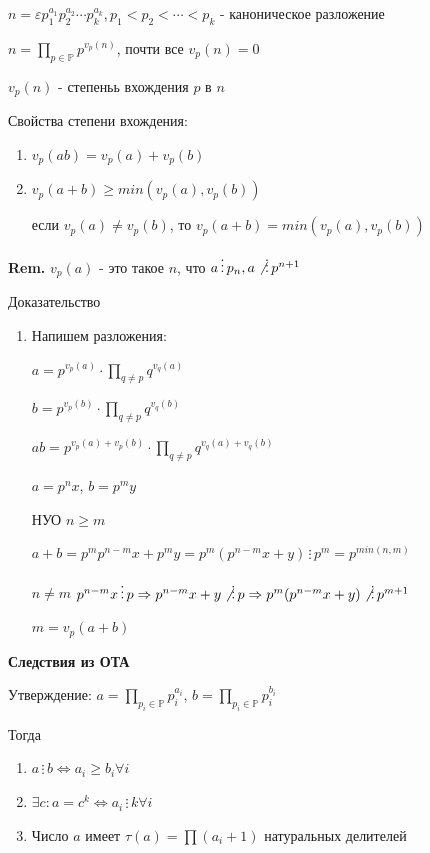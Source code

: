 \documentclass[14pt, letter paper]{article}
\begin{document}
$n = \varepsilon p_1^{a_1} p_2^{a_2} \cdots p_k^{a_k}, p_1 < p_2 < \cdots < p_k$ - каноническое разложение

$n = \prod\limits_{p \in \mathbb{P}} p^{v_p(n)}$, почти все $v_p(n) = 0$

$v_p(n)$ - степеньь вхождения $p$ в $n$

Свойства степени вхождения:

\begin{enumerate}
    \item $v_p(ab) = v_p(a) + v_p(b)$
    \item $v_p(a + b) \geq min(v_p(a), v_p(b))$

    если $v_p(a) \neq v_p(b)$, то $v_p(a+b) = min(v_p(a), v_p(b))$
\end{enumerate}

\textbf{Rem.} $v_p(a)$ - это такое $n$, что $a \, \vdots \, p_n, a \not\, \vdots \, p^{n+1}$

\begin{center}
    Доказательство
\end{center}

\begin{enumerate}
    \item Напишем разложения:

    $a = p^{v_p(a)} \cdot \prod\limits_{q \neq p} q^{v_q(a)}$

    $b = p^{v_p(b)} \cdot \prod\limits_{q \neq p} q^{v_q(b)}$

    $ab = p^{v_p(a) + v_p(b)} \cdot \prod\limits_{q \neq p} q^{v_q(a) + v_q(b)}$

    $a = p^n x$, $b = p^m y$

    НУО $n \geq m$

    $a + b = p^m p^{n-m} x + p^m y = p^m (p^{n-m} x + y) \, \vdots \, p^m = p^{min(n, m)}$

    $n \neq m$ $p^{n-m} x \, \vdots \, p \Rightarrow p^{n-m} x + y \not\, \vdots \, p \Rightarrow p^m(p^{n-m} x + y) \not\, \vdots \, p^{m+1}$

    $m = v_p(a+b)$
\end{enumerate}

\textbf{Следствия из ОТА}

Утверждение: $a = \prod\limits_{p_i \in \mathbb{P}} p_i^{a_i}$, $b = \prod\limits_{p_i \in \mathbb{P}} p_i^{b_i}$

Тогда 

\begin{enumerate}
    \item $a \, \vdots \, b \Leftrightarrow a_i \geq b_i \forall i$
    \item $\exists c : a = c^k \Leftrightarrow a_i \, \vdots \, k \forall i$
    \item Число $a$ имеет $\tau (a) = \prod (a_i + 1)$ натуральных делителей
\end{enumerate}
\end{document}
